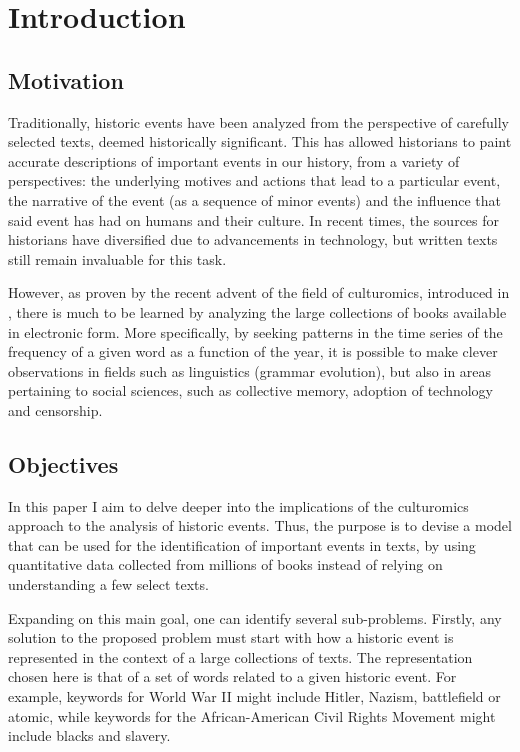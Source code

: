 \chapter{Introduction}
\label{chapter:intro}

\section{Motivation}
\label{sec:motivation}

Traditionally, historic events have been analyzed from the perspective of carefully selected texts, deemed historically significant. This has allowed historians to paint accurate descriptions of important events in our history, from a variety of perspectives: the underlying motives and actions that lead to a particular event, the narrative of the event (as a sequence of minor events) and the influence that said event has had on humans and their culture. In recent times, the sources for historians have diversified due to advancements in technology, but written texts still remain invaluable for this task.

However, as proven by the recent advent of the field of culturomics, introduced in \cite{Michel14012011}, there is much to be learned by analyzing the large collections of books available in electronic form. More specifically, by seeking patterns in the time series of the frequency of a given word as a function of the year, it is possible to make clever observations in fields such as linguistics (grammar evolution), but also in areas pertaining to social sciences, such as collective memory, adoption of technology and censorship.

\section{Objectives}
\label{sec:objectives}

In this paper I aim to delve deeper into the implications of the culturomics approach to the analysis of historic events. Thus, the purpose is to devise a model that can be used for the identification of important events in texts, by using quantitative data collected from millions of books instead of relying on understanding a few select texts.

Expanding on this main goal, one can identify several sub-problems. Firstly, any solution to the proposed problem must start with how a historic event is represented in the context of a large collections of texts. The representation chosen here is that of a set of words related to a given historic event. For example, keywords for World War II might include Hitler, Nazism, battlefield or atomic, while keywords for the African-American Civil Rights Movement might include blacks and slavery.

